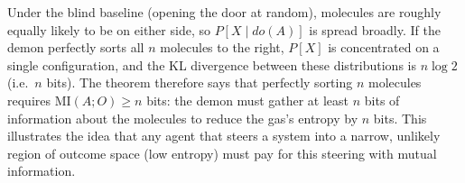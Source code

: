 \documentclass[11pt]{article}
\begin{document}
\begin{exercise}
\begin{remark}
\medskip
\noindent
Under the blind baseline (opening the door at random), molecules are roughly equally
likely to be on either side, so $P[X \mid do(A)]$ is spread broadly. If the demon
perfectly sorts all $n$ molecules to the right, $P[X]$ is concentrated on a single
configuration, and the KL divergence between these distributions is $n \log 2$ (i.e.\
$n$ bits). The theorem therefore says that perfectly sorting $n$ molecules requires
$\mathrm{MI}(A; O) \geq n$ bits: the demon must gather at least $n$ bits of
information about the molecules to reduce the gas's entropy by $n$ bits.
This illustrates the idea that any agent that steers a system into a narrow, unlikely region of outcome space (low entropy) must pay for this steering with mutual information. 
\end{remark}
\end{exercise}
\end{document}
